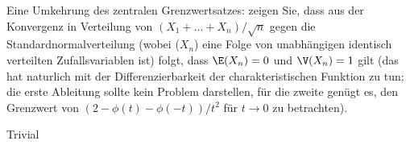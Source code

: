 \begin{exercise}

Eine Umkehrung des zentralen Grenzwertsatzes: zeigen Sie, dass aus der Konvergenz in Verteilung von $(X_1 + \ldots + X_n)/\sqrt{n}$ gegen die Standardnormalverteilung (wobei ($X_n$) eine Folge von unabhängigen identisch verteilten Zufallsvariablen ist) folgt, dass $\E(X_n) = 0$ und $\V(X_n) = 1$ gilt (das hat naturlich mit der Differenzierbarkeit der charakteristischen Funktion zu tun; die erste Ableitung sollte kein Problem darstellen, für die zweite genügt es, den Grenzwert von $(2 - \phi(t) - \phi(-t))/t^2$ für $t \to 0$ zu betrachten).

\end{exercise}

\begin{solution}

Trivial

\end{solution}
